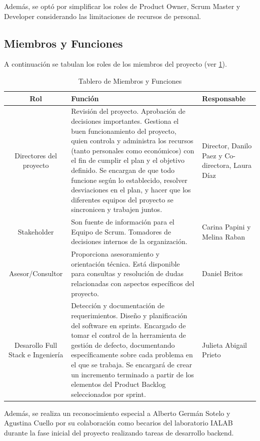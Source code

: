 Además, se optó por simplificar los roles de Product Owner, Scrum Master y Developer considerando las limitaciones de recursos de personal.



\subsection{Miembros y Funciones}
A continuación se tabulan los roles de los miembros del proyecto (ver \ref{tab:ccb}).

\begin{table}[h]
    \centering
    \begin{tabular}{|c|p{5cm}|p{4cm}|}
        \hline
        \textbf{Rol} & \textbf{Función} & \textbf{Responsable} \\
        \hline
        Directores del proyecto
        & Revisión del proyecto. Aprobación de decisiones importantes. Gestiona el buen funcionamiento del proyecto, quien controla y administra los recursos (tanto personales como económicos) con el fin de cumplir el plan y el objetivo definido. Se encargan de que todo funcione según lo establecido, resolver desviaciones en el plan, y hacer que los diferentes equipos del proyecto se sincronicen y trabajen juntos.
        & Director, Danilo Paez y Co-directora, Laura Díaz \\
        \hline
        Stakeholder
        & Son fuente de información para el Equipo de Scrum. Tomadores de decisiones  internos de la organización.
        & Carina Papini y Melina Raban \\
        \hline
        Asesor/Consultor
        &  Proporciona asesoramiento y orientación técnica.
        Está disponible para consultas y resolución de dudas
        relacionadas con aspectos específicos del proyecto.
        & Daniel Britos \\
        \hline
        Desarollo Full Stack e Ingeniería
        & Detección y documentación de requerimientos. Diseño y planificación del software en sprints. Encargado de tomar el control de la herramienta de gestión de defecto, documentando específicamente sobre cada problema en el que se trabaja.
        Se encargará de crear un incremento terminado a partir de los elementos del Product Backlog seleccionados por sprint.
        & Julieta Abigail Prieto\\
        \hline
    \end{tabular}
    \caption{Tablero de Miembros y Funciones}
    \label{tab:ccb}
\end{table}

Además, se realiza un reconocimiento especial a Alberto Germán Sotelo y Agustina Cuello por su colaboración como becarios del laboratorio IALAB durante la fase inicial del proyecto realizando tareas de desarrollo backend.

